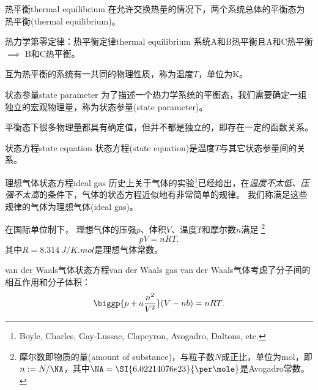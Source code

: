 \begin{definition}
	{热平衡}{thermal equilibrium}
	在允许交换热量的情况下，两个系统总体的平衡态为热平衡(thermal equilibrium)。
\end{definition}

\begin{theorem}{热力学第零定律：热平衡定律}{thermal equilibrium}
	系统A和B热平衡且A和C热平衡$\implies$ B和C热平衡。
\end{theorem}

\begin{corollary}
	互为热平衡的系统有一共同的物理性质，称为温度$T$，单位为K。
\end{corollary}

\begin{definition}
	{状态参量}{state parameter}
	为了描述一个热力学系统的平衡态，我们需要确定一组独立的宏观物理量，称为状态参量(state parameter)。
\end{definition}


\begin{remark}
	平衡态下很多物理量都具有确定值，但并不都是独立的，即存在一定的函数关系。
\end{remark}

\begin{definition}{状态方程}{state equation}
	状态方程(state equation)是温度$T$与其它状态参量间的关系。
\end{definition}

\begin{example}
	{理想气体状态方程}{ideal gas}
	历史上关于气体的实验\footnote{Boyle, Charles, Gay-Lussac, Clapeyron, Avogadro, Daltons, etc.}已经给出，在\textit{温度不太低、压强不太高}的条件下，气体的状态方程近似地有非常简单的规律。
	我们称满足这些规律的气体为理想气体(ideal gas)。

	在国际单位制下，
	理想气体的压强$p$、体积$V$、温度$T$和摩尔数$n$满足
	\footnote{摩尔数即物质的量(amount of substance)，与粒子数$N$成正比，单位为mol，即$n:=N/\NA$，其中$\NA=\SI{6.02214076e23}{\per\mole}$是Avogadro常数。}
	\begin{equation}
		\label{eqn:pV=nRT}
		pV=nRT.
	\end{equation}
	其中$R=\SI{8.314}{J/K.mol}$是理想气体常数。
\end{example}

\begin{example}
	{van der Waals气体状态方程}{van der Waals gas}
	van der Waals气体考虑了分子间的相互作用和分子体积：
	\begin{equation}
		\label{eqn:vdW}
		\biggp{p+a\frac{n^2}{V^2}}(V-nb)=nRT.
	\end{equation}
\end{example}


